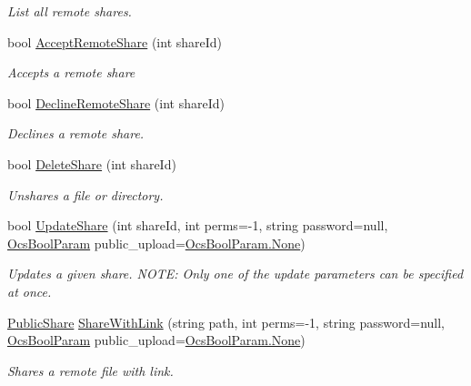 \begin{DoxyCompactItemize}
\begin{DoxyCompactList}\small\item\em List all remote shares. \end{DoxyCompactList}\item 
bool \hyperlink{classowncloudsharp_1_1_client_ace55eb0544bda9803e493dd80af14970}{Accept\+Remote\+Share} (int share\+Id)
\begin{DoxyCompactList}\small\item\em Accepts a remote share \end{DoxyCompactList}\item 
bool \hyperlink{classowncloudsharp_1_1_client_a8936411abf14870d211e4a62be3d7840}{Decline\+Remote\+Share} (int share\+Id)
\begin{DoxyCompactList}\small\item\em Declines a remote share. \end{DoxyCompactList}\item 
bool \hyperlink{classowncloudsharp_1_1_client_a7499d8f0c4fae0b22da4a35327547cca}{Delete\+Share} (int share\+Id)
\begin{DoxyCompactList}\small\item\em Unshares a file or directory. \end{DoxyCompactList}\item 
bool \hyperlink{classowncloudsharp_1_1_client_a096e6b5540091d8b3f296d899f4807dd}{Update\+Share} (int share\+Id, int perms=-\/1, string password=null, \hyperlink{namespaceowncloudsharp_a7d494b18f174086318df1bdf916068b5}{Ocs\+Bool\+Param} public\+\_\+upload=\hyperlink{namespaceowncloudsharp_a86ba7b86b85c7f5be2304a1ef7ae3157a6adf97f83acf6453d4a6a4b1070f3754}{Ocs\+Bool\+Param.\+None})
\begin{DoxyCompactList}\small\item\em Updates a given share. N\+O\+T\+E\+: Only one of the update parameters can be specified at once. \end{DoxyCompactList}\item 
\hyperlink{classowncloudsharp_1_1_types_1_1_public_share}{Public\+Share} \hyperlink{classowncloudsharp_1_1_client_ac44012d849ddbbbdab86509344d6504d}{Share\+With\+Link} (string path, int perms=-\/1, string password=null, \hyperlink{namespaceowncloudsharp_a7d494b18f174086318df1bdf916068b5}{Ocs\+Bool\+Param} public\+\_\+upload=\hyperlink{namespaceowncloudsharp_a86ba7b86b85c7f5be2304a1ef7ae3157a6adf97f83acf6453d4a6a4b1070f3754}{Ocs\+Bool\+Param.\+None})
\begin{DoxyCompactList}\small\item\em Shares a remote file with link. \end{DoxyCompactList}\item 

\end{DoxyCompactItemize}
